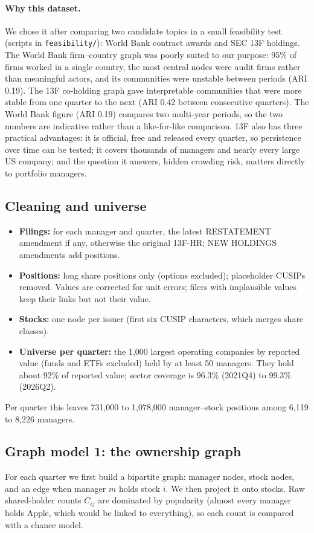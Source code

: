 \documentclass[10pt,a4paper]{article}
\begin{document}
\paragraph{Why this dataset.} We chose it after comparing two candidate topics in a small feasibility test (scripts in \texttt{feasibility/}): World Bank contract awards \cite{worldbank} and SEC 13F holdings. The World Bank firm--country graph was poorly suited to our purpose: 95\% of firms worked in a single country, the most central nodes were audit firms rather than meaningful actors, and its communities were unstable between periods (ARI 0.19). The 13F co-holding graph gave interpretable communities that were more stable from one quarter to the next (ARI 0.42 between consecutive quarters). The World Bank figure (ARI 0.19) compares two multi-year periods, so the two numbers are indicative rather than a like-for-like comparison. 13F also has three practical advantages: it is official, free and released every quarter, so persistence over time can be tested; it covers thousands of managers and nearly every large US company; and the question it answers, hidden crowding risk, matters directly to portfolio managers.

\subsection{Cleaning and universe}
\begin{itemize}
  \item \textbf{Filings:} for each manager and quarter, the latest RESTATEMENT amendment if any, otherwise the original 13F-HR; NEW HOLDINGS amendments add positions.
  \item \textbf{Positions:} long share positions only (options excluded); placeholder CUSIPs removed. Values are corrected for unit errors; filers with implausible values keep their links but not their value.
  \item \textbf{Stocks:} one node per issuer (first six CUSIP characters, which merges share classes).
  \item \textbf{Universe per quarter:} the 1,000 largest operating companies by reported value (funds and ETFs excluded) held by at least 50 managers. They hold about 92\% of reported value; sector coverage is 96.3\% (2021Q4) to 99.3\% (2026Q2).
\end{itemize}
Per quarter this leaves 731,000 to 1,078,000 manager--stock positions among 6,119 to 8,226 managers.

\subsection{Graph model 1: the ownership graph}
For each quarter we first build a bipartite graph: manager nodes, stock nodes, and an edge when manager $m$ holds stock $i$. We then project it onto stocks. Raw shared-holder counts $C_{ij}$ are dominated by popularity (almost every manager holds Apple, which would be linked to everything), so each count is compared with a chance model.
\end{document}
